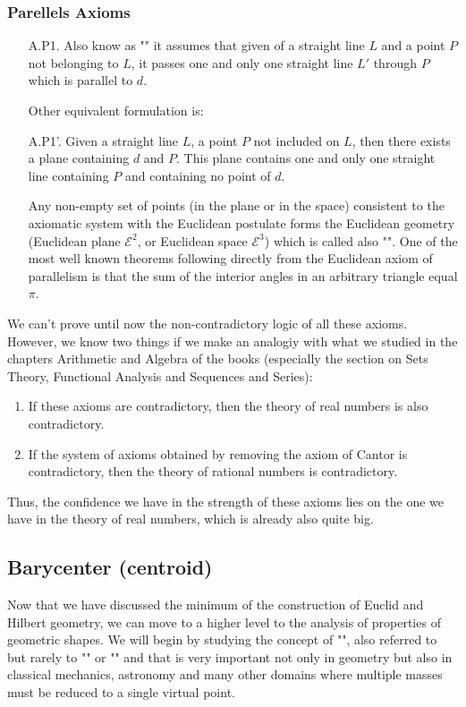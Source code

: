 	\subsubsection{Parellels Axioms}
	\begin{enumerate}
		\item[A.P1.] Also know as "" it assumes that given of a straight line $L$ and a point $P$ not belonging to $L$, it passes one and only one straight line $L'$ through $P$ which is parallel to $d$.
		
		Other equivalent formulation is:
	
		\item[A.P1'.] Given a straight line $L$, a point $P$ not included on $L$, then there exists a plane containing $d$ and $P$. This plane contains one and only one straight line containing $P$ and containing no point of $d$.
		
		Any non-empty set of points (in the plane or in the space) consistent to the axiomatic system with the Euclidean postulate forms the Euclidean geometry (Euclidean plane $\mathcal{E}^2$, or Euclidean space $\mathcal{E}^3$) which is called also "". One of the most well known theorems following directly from the Euclidean axiom of parallelism is that the sum of the interior angles in an arbitrary triangle equal $\pi$.
	\end{enumerate}
	
	We can't prove until now the non-contradictory logic of all these axioms. However, we know two things if we make an analogiy with what we studied in the chapters Arithmetic and Algebra of the books (especially the section on Sets Theory, Functional Analysis and Sequences and Series):
   \begin{enumerate}
      \item If these axioms are contradictory, then the theory of real numbers is also contradictory.

      \item If the system of axioms obtained by removing the axiom of Cantor is contradictory, then the theory of rational numbers is contradictory.
   \end{enumerate}
   Thus, the confidence we have in the strength of these axioms lies on the one we have in the theory of real numbers, which is already also quite big.
   
   \pagebreak
   \subsection{Barycenter (centroid)}
   Now that we have discussed the minimum of the construction of Euclid and Hilbert geometry, we can move to a higher level to the analysis of properties of geometric shapes. We will begin by studying the concept of "", also referred to but rarely to "" or "" and that is very important not only in geometry but also in classical mechanics, astronomy and many other domains where multiple masses must be reduced to a single virtual point.
   
